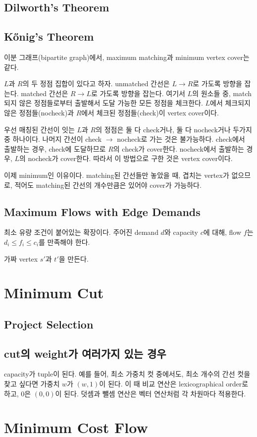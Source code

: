\documentclass[10pt,twocolumn,letterpaper]{article}
\begin{document}
\subsection{Dilworth's Theorem}

\subsection{Kőnig's Theorem}

이분 그래프(bipartite graph)에서, maximum matching과 minimum vertex cover는 같다.

$L$과 $R$의 두 정점 집합이 있다고 하자. unmatched 간선은 $L \rightarrow R$로 가도록 방향을 잡는다. matched 간선은 $R \rightarrow L$로 가도록 방향을 잡는다.
여기서 $L$의 원소들 중, match되지 않은 정점들로부터 출발해서 도달 가능한 모든 정점을 체크한다.
$L$에서 체크되지 않은 정점들(nocheck)과 $R$에서 체크된 정점들(check)이 vertex cover이다.

우선 매칭된 간선이 잇는 $L$과 $R$의 정점은 둘 다 check거나, 둘 다 nocheck거나 두가지 중 하나이다.
나머지 간선이 check $\rightarrow$ nocheck로  가는 것은 불가능하다.
check에서 출발하는 경우, check에 도달하므로 $R$의 check가 cover한다.
nocheck에서 출발하는 경우, $L$의 nocheck가 cover한다.
따라서 이 방법으로 구한 것은 vertex cover이다.

이제 minimum인 이유이다. matching된 간선들만 놓았을 때, 겹치는 vertex가 없으므로, 적어도 matching된 간선의 개수만큼은 있어야 cover가 가능하다.

\subsection{Maximum Flows with Edge Demands}

최소 유량 조건이 붙어있는 확장이다. 주어진 demand $d$와 capacity $c$에 대해, flow $f$는 $d_i \le f_i \le c_i$를 만족해야 한다.

가짜 vertex $s'$과 $t'$을 만든다.

\section{Minimum Cut}

\subsection{Project Selection}

\subsection{cut의 weight가 여러가지 있는 경우}

capacity가 tuple이 된다.
예를 들어, 최소 가중치 컷 중에서도, 최소 개수의 간선 컷을 찾고 싶다면 가중치 $w$가 $(w, 1)$이 된다.
이 때 비교 연산은 lexicographical order로 하고, $0$은 $(0, 0)$이 된다. 덧셈과 뺄셈 연산은 벡터 연산처럼 각 차원마다 적용한다.

\section{Minimum Cost Flow}
\end{document}
